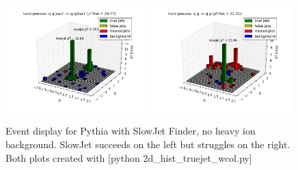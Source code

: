 \documentclass[11pt]{article}
\begin{document}
\begin{figure}[h]
\begin{center}
\includegraphics[width=0.49\textwidth]{2d_hist_truejet_wcol1.png}
\includegraphics[width=0.49\textwidth]{2d_hist_truejet_wcol2.png}
\label{fig_label}
\caption{Event display for Pythia with SlowJet Finder, no heavy ion background.  SlowJet succeeds on the left but struggles on the right. Both plots created with [python 2d\_hist\_truejet\_wcol.py]}
\end{center}
\end{figure}
\end{document}
